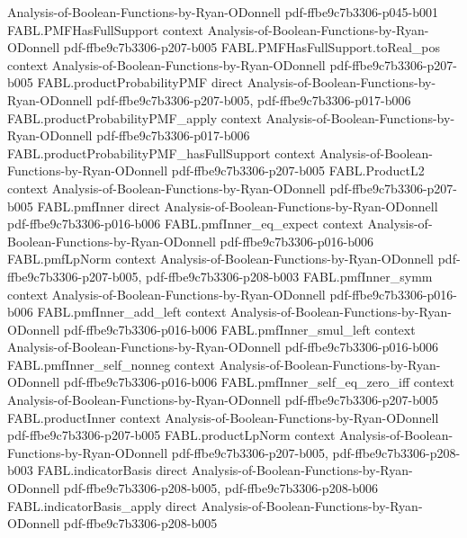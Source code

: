 \begin{theorem}
  {Analysis-of-Boolean-Functions-by-Ryan-ODonnell}
  {pdf-ffbe9c7b3306-p045-b001}
\proofstep
  {FABL.PMFHasFullSupport}
  {context}
  {Analysis-of-Boolean-Functions-by-Ryan-ODonnell}
  {pdf-ffbe9c7b3306-p207-b005}
\proofstep
  {FABL.PMFHasFullSupport.toReal_pos}
  {context}
  {Analysis-of-Boolean-Functions-by-Ryan-ODonnell}
  {pdf-ffbe9c7b3306-p207-b005}
\proofstep
  {FABL.productProbabilityPMF}
  {direct}
  {Analysis-of-Boolean-Functions-by-Ryan-ODonnell}
  {pdf-ffbe9c7b3306-p207-b005,
    pdf-ffbe9c7b3306-p017-b006}
\proofstep
  {FABL.productProbabilityPMF_apply}
  {context}
  {Analysis-of-Boolean-Functions-by-Ryan-ODonnell}
  {pdf-ffbe9c7b3306-p017-b006}
\proofstep
  {FABL.productProbabilityPMF_hasFullSupport}
  {context}
  {Analysis-of-Boolean-Functions-by-Ryan-ODonnell}
  {pdf-ffbe9c7b3306-p207-b005}
\proofstep
  {FABL.ProductL2}
  {context}
  {Analysis-of-Boolean-Functions-by-Ryan-ODonnell}
  {pdf-ffbe9c7b3306-p207-b005}
\proofstep
  {FABL.pmfInner}
  {direct}
  {Analysis-of-Boolean-Functions-by-Ryan-ODonnell}
  {pdf-ffbe9c7b3306-p016-b006}
\proofstep
  {FABL.pmfInner_eq_expect}
  {context}
  {Analysis-of-Boolean-Functions-by-Ryan-ODonnell}
  {pdf-ffbe9c7b3306-p016-b006}
\proofstep
  {FABL.pmfLpNorm}
  {context}
  {Analysis-of-Boolean-Functions-by-Ryan-ODonnell}
  {pdf-ffbe9c7b3306-p207-b005,
    pdf-ffbe9c7b3306-p208-b003}
\proofstep
  {FABL.pmfInner_symm}
  {context}
  {Analysis-of-Boolean-Functions-by-Ryan-ODonnell}
  {pdf-ffbe9c7b3306-p016-b006}
\proofstep
  {FABL.pmfInner_add_left}
  {context}
  {Analysis-of-Boolean-Functions-by-Ryan-ODonnell}
  {pdf-ffbe9c7b3306-p016-b006}
\proofstep
  {FABL.pmfInner_smul_left}
  {context}
  {Analysis-of-Boolean-Functions-by-Ryan-ODonnell}
  {pdf-ffbe9c7b3306-p016-b006}
\proofstep
  {FABL.pmfInner_self_nonneg}
  {context}
  {Analysis-of-Boolean-Functions-by-Ryan-ODonnell}
  {pdf-ffbe9c7b3306-p016-b006}
\proofstep
  {FABL.pmfInner_self_eq_zero_iff}
  {context}
  {Analysis-of-Boolean-Functions-by-Ryan-ODonnell}
  {pdf-ffbe9c7b3306-p207-b005}
\proofstep
  {FABL.productInner}
  {context}
  {Analysis-of-Boolean-Functions-by-Ryan-ODonnell}
  {pdf-ffbe9c7b3306-p207-b005}
\proofstep
  {FABL.productLpNorm}
  {context}
  {Analysis-of-Boolean-Functions-by-Ryan-ODonnell}
  {pdf-ffbe9c7b3306-p207-b005,
    pdf-ffbe9c7b3306-p208-b003}
\proofstep
  {FABL.indicatorBasis}
  {direct}
  {Analysis-of-Boolean-Functions-by-Ryan-ODonnell}
  {pdf-ffbe9c7b3306-p208-b005,
    pdf-ffbe9c7b3306-p208-b006}
\proofstep
  {FABL.indicatorBasis_apply}
  {direct}
  {Analysis-of-Boolean-Functions-by-Ryan-ODonnell}
  {pdf-ffbe9c7b3306-p208-b005}

\end{theorem}
